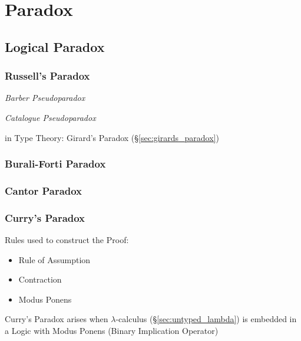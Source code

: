 \section{Paradox}\label{sec:paradox}

\subsection{Logical Paradox}\label{sec:logical_paradox}
\cite{curry77}

\subsubsection{Russell's Paradox}\label{sec:russells_paradox}

\emph{Barber Pseudoparadox}

\emph{Catalogue Pseudoparadox}

in Type Theory: Girard's Paradox (\S\ref{sec:girards_paradox})



\subsubsection{Burali-Forti Paradox}\label{sec:baruliforti_paradox}

\subsubsection{Cantor Paradox}\label{sec:cantor_paradox}

\subsubsection{Curry's Paradox}\label{sec:currys_paradox}

Rules used to construct the Proof:
\begin{itemize}
  \item Rule of Assumption
  \item Contraction
  \item Modus Ponens
\end{itemize}

Curry's Paradox arises when $\lambda$-calculus
(\S\ref{sec:untyped_lambda}) is embedded in a Logic with Modus Ponens
(Binary Implication Operator)

